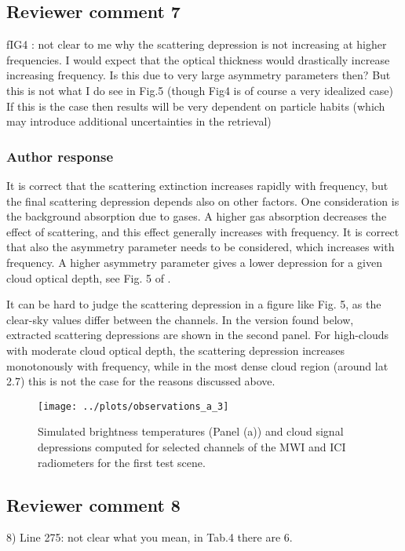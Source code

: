 \documentclass[11pt]{scrartcl}
\begin{document}
\subsection*{Reviewer comment 7}

fIG4 : not clear to me why the scattering depression is not increasing at
higher frequencies. I would expect that the optical thickness would drastically
increase increasing frequency. Is this due to very large asymmetry parameters
then? But this is not what I do see in Fig.5 (though Fig4 is of course a very
idealized case) If this is the case then results will be very dependent on
particle habits (which may introduce additional uncertainties in the retrieval)

\subsubsection*{Author response}

It is correct that the scattering extinction increases rapidly with frequency, but the
final scattering depression depends also on other factors. One consideration is the
background absorption due to gases. A higher gas absorption decreases the effect of
scattering, and this effect generally increases with frequency. It is correct that also
the asymmetry parameter needs to be considered, which increases with frequency. A higher
asymmetry parameter gives a lower depression for a given cloud optical depth, see Fig. 5
of \citet{eriksson15}.

It can be hard to judge the scattering depression in a figure like Fig. 5, as
the clear-sky values differ between the channels. In the version found below,
extracted scattering depressions are shown in the second panel. For high-clouds
with moderate cloud optical depth, the scattering depression increases
monotonously with frequency, while in the most dense cloud region (around lat
2.7) this is not the case for the reasons discussed above.

\begin{figure}[!hbpt]
  \centering
  \texttt{[image: ../plots/observations\_a\_3]}
  \caption{Simulated brightness temperatures (Panel (a)) and cloud signal
    depressions computed for selected channels of the MWI and ICI radiometers
    for the first test scene.}
  \label{fig:depressions}
\end{figure}

\subsection*{Reviewer comment 8}
8) Line 275: not clear what you mean, in Tab.4 there are 6. 
\end{document}
